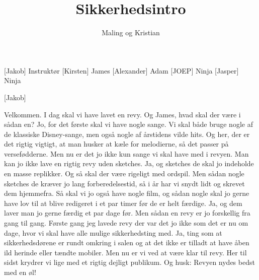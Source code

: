 \documentclass[a4paper,11pt]{article}
\title{Sikkerhedsintro}
\author{Maling og Kristian}
\begin{document}
	\maketitle
	
	\begin{roles}
[Jakob] Instruktør
	    [Kirsten] James
	    [Alexander] Adam
	    [JOEP] Ninja
	    [Jasper] Ninja
	\end{roles}
	
	\begin{props}
		[Jakob]
	\end{props}
	

	\begin{sketch}
 Velkommen. I dag skal vi have lavet en revy. Og James, hvad skal der være i sådan en?	
 Jo, for det første skal vi have nogle sange. Vi skal både bruge nogle af de klassiske Disney-sange, men også nogle af årstidens vilde hits.
 Og her, der er det rigtig vigtigt, at man husker at kæle for melodierne, så det passer på versefødderne. 
 Men nu er det jo ikke kun sange vi skal have med i revyen. Man kan jo ikke lave en rigtig revy uden sketches.
 Ja, og sketches de skal jo indeholde en masse replikker.
 Og så skal der være rigeligt med ordspil. 
 Men sådan nogle sketches de kræver jo lang forberedelsestid, så i år har vi snydt lidt og skrevet dem hjemmefra.
 Så skal vi jo også have nogle film, og sådan nogle skal jo gerne have lov til at blive redigeret i et par timer før de er helt færdige.  
 Ja, og dem laver man jo gerne færdig et par dage før. 
 Men sådan en revy er jo forskellig fra gang til gang. 
 Første gang jeg lavede revy der var det jo ikke som det er nu om dage, hvor vi skal have alle mulige sikkerhedsting med. 
 Ja, ting som at sikkerhedsdørene er rundt omkring i salen og at det ikke er tilladt at have åben ild herinde eller tændte mobiler.
 Men nu er vi ved at være klar til revy. Her til sidst krydrer vi lige med et rigtig dejligt publikum. 
    Og husk: Revyen nydes bedst med en øl!

\end{sketch}
\end{document}
